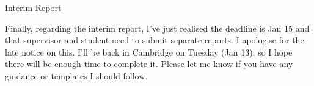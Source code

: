 \documentclass[12pt]{article}
\begin{document}
Interim Report

Finally, regarding the interim report, I've just realised the deadline is Jan 15 and that supervisor and student need to submit separate reports. I apologise for the late notice on this. I'll be back in Cambridge on Tuesday (Jan 13), so I hope there will be enough time to complete it. Please let me know if you have any guidance or templates I should follow.

\fi

\end{document}
